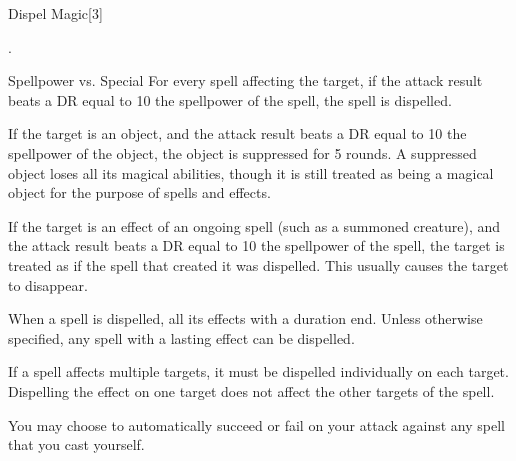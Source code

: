 \begin{spellsection}{Dispel Magic}[3]
    \begin{spellheader}
        .
    \end{spellheader}
    \begin{spellcontent}
        \begin{spelltargetinginfo}
        \end{spelltargetinginfo}
        \begin{spelleffects}
            \begin{spellattack}{Spellpower vs. Special}
                \spelleffect For every spell affecting the target, if the attack result beats a DR equal to 10 \add the spellpower of the spell, the spell is dispelled.

                If the target is an object, and the attack result beats a DR equal to 10 \add the spellpower of the object, the object is suppressed for 5 rounds. A suppressed object loses all its magical abilities, though it is still treated as being a magical object for the purpose of spells and effects.

                If the target is an effect of an ongoing spell (such as a summoned creature), and the attack result beats a DR equal to 10 \add the spellpower of the spell, the target is treated as if the spell that created it was dispelled. This usually causes the target to disappear.
            \end{spellattack}
        \end{spelleffects}
    \end{spellcontent}
    \begin{spellfooter}
        \spellnotes When a spell is dispelled, all its effects with a duration end. Unless otherwise specified, any spell with a lasting effect can be dispelled.

        If a spell affects multiple targets, it must be dispelled individually on each target. Dispelling the effect on one target does not affect the other targets of the spell.

        You may choose to automatically succeed or fail on your attack against any spell that you cast yourself.


\end{spellfooter}
\end{spellsection}
